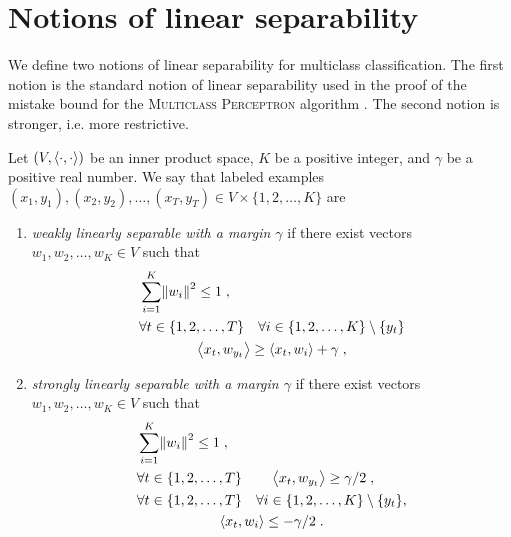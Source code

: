 \section{Notions of linear separability}
\label{section:notions-of-linear-separability}

We define two notions of linear separability for multiclass classification. The
first notion is the standard notion of linear separability used in the proof of
the mistake bound for the \textsc{Multiclass Perceptron} algorithm \citep[see e.g.][]{Crammer-Singer-2003}. The second
notion is stronger, i.e. more restrictive. %

\begin{definition}
\label{definition:linear-separability}
Let $(V,\left\langle \cdot, \cdot \right\rangle)$ be an inner product space, $K$ be a positive
integer, and $\gamma$ be a positive real number.
We say that labeled examples $(x_1, y_1),
(x_2, y_2), \dots, (x_T, y_T) \in V \times \{1,2,\dots,K\}$ are
\begin{enumerate}
\item
\emph{weakly linearly separable with a margin $\gamma$} if there exist vectors
$w_1, w_2, \dots, w_K \in V$ such that
\begin{align}
\label{equation:weak-linear-separability-1}
& \sum_{i=1}^K \norm{w_i}^2 \le 1 \; , \\
\label{equation:weak-linear-separability-2}
& \begin{gathered}
\forall t \in \{1,2,\dots,T\} \quad \forall i \in \{1,2,\dots, K\} \setminus \{y_t\} \\
\left\langle x_t, w_{y_t} \right\rangle \ge \left\langle x_t, w_i \right\rangle + \gamma \; ,
\end{gathered}
\end{align}
\item
\emph{strongly linearly separable with a margin $\gamma$} if there exist vectors
$w_1, w_2, \dots, w_K \in V$ such that
\begin{align}
\label{equation:strong-linear-separability-1}
& \sum_{i=1}^K \norm{w_i}^2 \le 1 \; , \\
\label{equation:strong-linear-separability-2}
& \forall t \in \{1,2,\dots,T\} \qquad \left\langle x_t, w_{y_t} \right\rangle \ge \gamma/2 \; , \\
\label{equation:strong-linear-separability-3}
& \begin{gathered}
\forall t \in \{1,2,\dots,T\} \quad \forall i \in \{1,2,\dots, K\} \setminus \{y_t\}, \\
\left\langle x_t, w_i \right\rangle \le - \gamma/2 \; .
\end{gathered}
\end{align}
\end{enumerate}
\end{definition}

